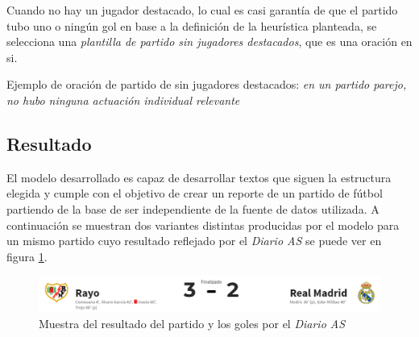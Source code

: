     Cuando no hay un jugador destacado, lo cual es casi garantía de que el partido tubo uno o ningún gol en base a la definición de la heurística planteada, se selecciona una 
    \textit{plantilla de partido sin jugadores destacados}, que es una oración en si.

    Ejemplo de oración de partido de sin jugadores destacados: \textit{en un partido parejo, no hubo ninguna actuación individual relevante}


\subsection{Resultado}

    El modelo desarrollado es capaz de desarrollar textos que siguen la estructura elegida y cumple con el objetivo de 
crear un reporte de un partido de fútbol partiendo de la base de ser independiente de la fuente de datos utilizada. 
A continuación se muestran  dos variantes distintas producidas por el modelo para un mismo partido cuyo resultado reflejado por el 
\textit{Diario AS} se puede ver en figura \ref{fig_rayomadrid}.
\\

\begin{figure}[!]
    \begin{center}
        \includegraphics[scale=0.4]{Graphics/rayomadrid.png}
    \end{center}
    \caption{Muestra del resultado del partido y los goles por el \textit{Diario AS}}
    \label{fig_rayomadrid}
\end{figure}


